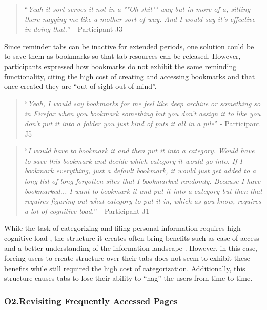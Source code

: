 \begin{quote}
``\emph{Yeah it sort serves it not in a ""Oh shit"" way but in more of a, sitting there nagging me like a mother sort of way. And I would say it's effective in doing that.}'' - Participant J3
\end{quote}

Since reminder tabs can be inactive for extended periods, one solution could be to save them as bookmarks so that tab resources can be released. However, participants expressed how bookmarks do not exhibit the same reminding functionality, citing the high cost of creating and accessing bookmarks and that once created they are ``out of sight out of mind''.

\begin{quote}
``\emph{Yeah, I would say bookmarks for me feel like deep archive or something so in Firefox when you bookmark something but you don't assign it to like you don't put it into a folder you just kind of puts it all in a pile}'' - Participant J5
\end{quote}

\begin{quote}
``\emph{I would have to bookmark it and then put it into a category. Would have to save this bookmark and decide which category it would go into. If I bookmark everything, just a default bookmark, it would just get added to a long list of long-forgotten sites that I bookmarked randomly. Because I have bookmarked... I want to bookmark it and put it into a category but then that requires figuring out what category to put it in, which as you know, requires a lot of cognitive load.}'' - Participant J1
\end{quote}

While the task of categorizing and filing personal information requires high cognitive load \cite{lansdale1988psychology},
the structure it creates often bring benefits such as ease of access and a better understanding of the information landscape \cite{strauss1998basics}. However, in this case, forcing users to create structure over their tabs does not seem to exhibit these benefits while still required the high cost of categorization. Additionally, this structure causes tabs to lose their ability to ``nag'' the users from time to time.

\subsubsection{O2.Revisiting Frequently Accessed Pages}

